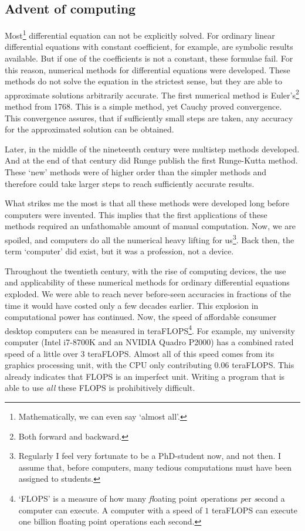 \subsection{Advent of computing}

Most\footnote{Mathematically, we can even say `almost all'.} differential equation can not be explicitly solved. For ordinary linear differential equations with constant coefficient, for example, are symbolic results available. But if one of the coefficients is not a constant, these formulae fail. For this reason, numerical methods for differential equations were developed. These methods do not solve the equation in the strictest sense, but they are able to approximate solutions arbitrarily accurate. The first numerical method is Euler's\footnote{Both forward and backward.} method from 1768. This is a simple method, yet Cauchy proved convergence. This convergence assures, that if sufficiently small steps are taken, any accuracy for the approximated solution can be obtained.

Later, in the middle of the nineteenth century were multistep methods developed. And at the end of that century did Runge publish the first Runge-Kutta method. These `new' methods were of higher order than the simpler methods and therefore could take larger steps to reach sufficiently accurate results.

What strikes me the most is that all these methods were developed long before computers were invented. This implies that the first applications of these methods required an unfathomable amount of manual computation. Now, we are spoiled, and computers do all the numerical heavy lifting for us\footnote{Regularly I feel very fortunate to be a PhD-student now, and not then. I assume that, before computers, many tedious computations must have been assigned to students.}. Back then, the term `computer' did exist, but it was a profession, not a device.

Throughout the twentieth century, with the rise of computing devices, the use and applicability of these numerical methods for ordinary differential equations exploded. We were able to reach never before-seen accuracies in fractions of the time it would have costed only a few decades earlier. This explosion in computational power has continued. Now, the speed of affordable consumer desktop computers can be measured in teraFLOPS\footnote{`FLOPS' is a measure of how many \emph{fl}oating point \emph{o}perations \emph{p}er \emph{s}econd a computer can execute. A computer with a speed of $1$ teraFLOPS can execute  one billion floating point operations each second.}. For example, my university computer (Intel i7-8700K and an NVIDIA Quadro P2000) has a combined rated speed of a little over 3 teraFLOPS. Almost all of this speed comes from its graphics processing unit, with the CPU only contributing $0.06$ teraFLOPS. This already indicates that FLOPS is an imperfect unit. Writing a program that is able to use \emph{all} these FLOPS is prohibitively difficult.


